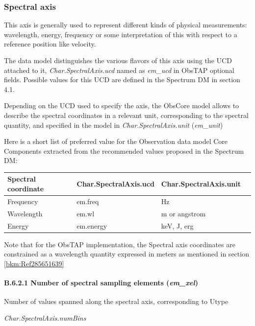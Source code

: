 \documentclass[11pt,a4paper]{ivoa}
\begin{document}
\subsubsection{Spectral axis}
This axis is generally used to represent different kinds of physical measurements: wavelength, energy, frequency or some
interpretation of this with respect to a reference position like velocity.

The data model distinguishes the various flavors of this axis using the UCD attached to it, \emph{Char.SpectralAxis.ucd} named
as \emph{em\_ucd} in ObsTAP optional fields.  Possible values for this UCD are defined in the Spectrum DM
\citep{2011ivoa.spec.1120M} in section 4.1.

Depending on the UCD used to specify the axis, the ObsCore model allows to describe the spectral coordinates in a
relevant unit, corresponding to the spectral quantity, and specified in the model in \emph{Char.SpectralAxis.unit} (\emph{em\_unit})

Here is a short list of preferred value for the Observation data model Core Components extracted from the recommended
values proposed in the Spectrum DM:

\vspace{0.3cm}
\begin{tabular}{|l|p{}|p{}|p{}|}
\hline
Spectral coordinate & Char.SpectralAxis.ucd & Char.SpectralAxis.unit\\\hline
Frequency & em.freq & Hz\\\hline
Wavelength & em.wl & m or angstrom\\\hline
Energy & em.energy & keV, J, erg\\\hline
\end{tabular}
\vspace{0.3cm}

Note that for the ObsTAP implementation, the Spectral axis coordinates are constrained as a wavelength quantity
expressed in meters as mentioned in section \ref{bkm:Ref285651639}

\paragraph{B.6.2.1 Number of spectral sampling elements (\emph{em\_xel})}
Number of values spanned along the spectral axis, corresponding to Utype

\emph{Char.SpectralAxis.numBins}
\end{document}
